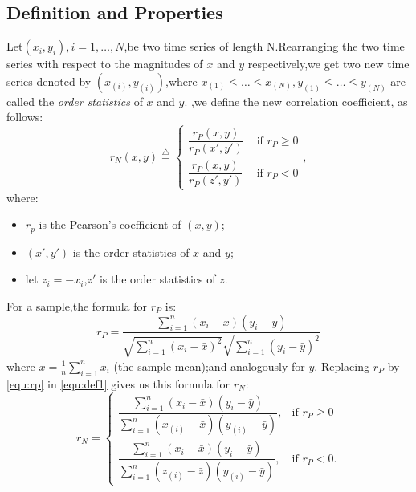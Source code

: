 \documentclass[journal]{IEEEtran}
\begin{document}
  \subsection{Definition and Properties}
    Let$(x_{i},y_{i}),i=1,\dots ,N$,be two time series of length N.Rearranging the two time series with respect to the magnitudes of $x$ and $y$ respectively,we get two new time series denoted by $(x_{(i)},y_{(i)})$,where $x_{(1)}\leq \dots \leq x_{(N)},y_{(1)}\leq \dots \leq y_{(N)}$ are called the \emph{order statistics } of $x$ and $y$. ,we define the new correlation coefficient, as follows:
    \begin{equation} \label{equ:def1}
      r_N(x,y)\overset{\bigtriangleup }{=}\begin{cases}
                                            \dfrac{r_{P}(x,y)}{r_{P}({x}',{y}')} & \text{ if } r_{P}\geq 0 \\
                                            \dfrac{r_{P}(x,y)}{r_{P}({z}',{y}')} & \text{ if } r_{P}<0
                                          \end{cases},
    \end{equation}
    where:
    \begin{itemize}
      \item $r_{p}$ is the Pearson's coefficient of $(x,y)$;
      \item $({x}',{y}')$ is the order statistics of $x$ and $y$;
      \item let $z_{i}=-x_{i}$,${z}'$ is the order statistics of $z$.
    \end{itemize}
    For a sample,the formula for $r_{P}$ is:
    \begin{equation} \label{equ:rp}
      {r}_{P}=\frac{\sum_{i=1}^{n}(x_{i}-\bar{x})(y_{i}-\bar{y})}{\sqrt{\sum_{i=1}^{n}(x_{i}-\bar{x})^{2}}\sqrt{\sum_{i=1}^{n}(y_{i}-\bar{y})^{2}}}
    \end{equation}
    where $\bar{x}=\frac{1}{n}\sum_{i=1}^{n}x_{i}$ (the sample mean);and analogously for $\bar{y}$.
    Replacing $r_{P}$ by \eqref{equ:rp} in \eqref{equ:def1} gives us this formula for $r_{N}$:
    \begin{equation} \label{equ:def2}
      {r}_{N}=\begin{cases}
                \dfrac{\sum_{i=1}^{n}(x_{i}-\bar{x})(y_{i}-\bar{y})}{\sum_{i=1}^{n}(x_{(i)}-\bar{x})(y_{(i)}-\bar{y})}, & \mbox{if } r_{P}\geq 0 \\
                \dfrac{\sum_{i=1}^{n}(x_{i}-\bar{x})(y_{i}-\bar{y})}{\sum_{i=1}^{n}(z_{(i)}-\bar{z})(y_{(i)}-\bar{y})}, & \mbox{if }r_{P}<0.
              \end{cases}
    \end{equation}
\end{document}
